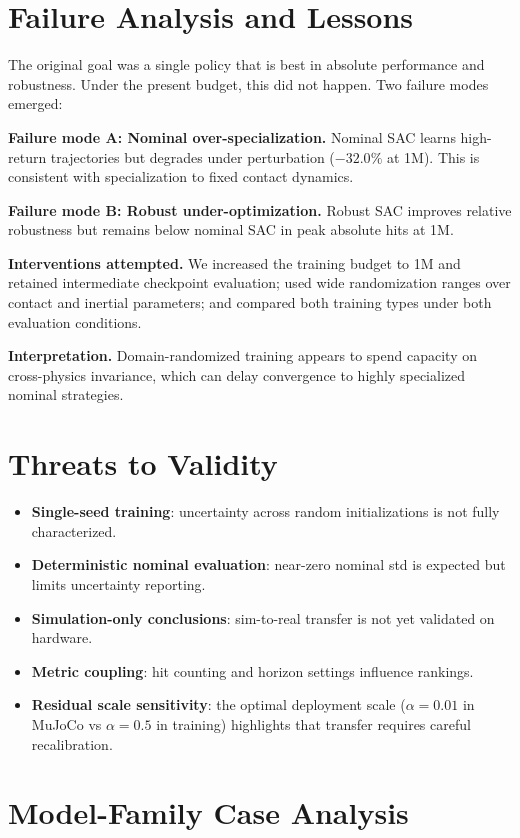 \documentclass[10pt,twocolumn,letterpaper]{article}
\begin{document}
\section{Failure Analysis and Lessons}
The original goal was a single policy that is best in absolute performance and robustness. Under the present budget, this did not happen. Two failure modes emerged:

\textbf{Failure mode A: Nominal over-specialization.}
Nominal SAC learns high-return trajectories but degrades under perturbation ($-32.0\%$ at 1M). This is consistent with specialization to fixed contact dynamics.

\textbf{Failure mode B: Robust under-optimization.}
Robust SAC improves relative robustness but remains below nominal SAC in peak absolute hits at 1M.

\textbf{Interventions attempted.}
We increased the training budget to 1M and retained intermediate checkpoint evaluation; used wide randomization ranges over contact and inertial parameters; and compared both training types under both evaluation conditions.

\textbf{Interpretation.}
Domain-randomized training appears to spend capacity on cross-physics invariance, which can delay convergence to highly specialized nominal strategies.

\section{Threats to Validity}
\begin{itemize}[leftmargin=*,noitemsep]
    \item \textbf{Single-seed training}: uncertainty across random initializations is not fully characterized.
    \item \textbf{Deterministic nominal evaluation}: near-zero nominal std is expected but limits uncertainty reporting.
    \item \textbf{Simulation-only conclusions}: sim-to-real transfer is not yet validated on hardware.
    \item \textbf{Metric coupling}: hit counting and horizon settings influence rankings.
    \item \textbf{Residual scale sensitivity}: the optimal deployment scale ($\alpha = 0.01$ in MuJoCo vs $\alpha = 0.5$ in training) highlights that transfer requires careful recalibration.
\end{itemize}

\section{Model-Family Case Analysis}
\end{document}

